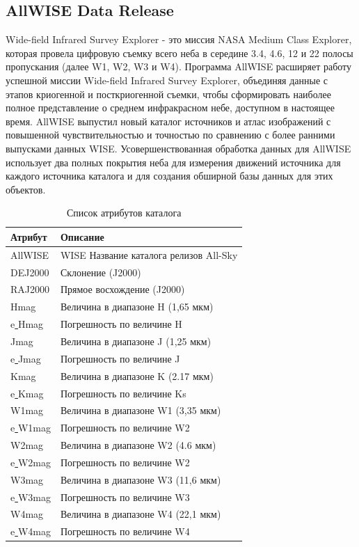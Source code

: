 \documentclass[12pt, a4paper]{article}
\begin{document}
	\subsection*{AllWISE Data Release}
	Wide-field Infrared Survey Explorer - это миссия NASA Medium Class Explorer, которая провела цифровую съемку всего неба в середине 3.4, 4.6, 12 и 22 полосы пропускания (далее W1, W2, W3 и W4). Программа AllWISE расширяет работу успешной миссии Wide-field Infrared Survey Explorer, объединяя данные с этапов криогенной и посткриогенной съемки, чтобы сформировать наиболее полное представление о среднем инфракрасном небе, доступном в настоящее время. AllWISE выпустил новый каталог источников и атлас изображений с повышенной чувствительностью и точностью по сравнению с более ранними выпусками данных WISE. Усовершенствованная обработка данных для AllWISE использует два полных покрытия неба для измерения движений источника для каждого источника каталога и для создания обширной базы данных для этих объектов.
	\newline
	\begin{table}[h]
	\centering
	\begin{tabular}{|l|l|}
	\hline
	Атрибут & Описание \\ \hline
	AllWISE & WISE Название каталога релизов All-Sky \\ \hline
	DEJ2000 & Склонение (J2000) \\ \hline
	RAJ2000 & Прямое восхождение (J2000) \\ \hline
	Hmag & Величина в диапазоне H (1,65 мкм) \\ \hline
	e\underline{ }Hmag & Погрешность по величине H \\ \hline
	Jmag & Величина в диапазоне J (1,25 мкм) \\ \hline
	e\underline{ }Jmag & Погрешность по величине J \\ \hline
	Kmag & Величина в диапазоне K (2.17 мкм) \\ \hline
	e\underline{ }Kmag & Погрешность по величине Ks \\ \hline
	W1mag & Величина в диапазоне W1 (3,35 мкм) \\ \hline
	e\underline{ }W1mag & Погрешность по величине W2 \\ \hline
	W2mag & Величина в диапазоне W2 (4.6 мкм) \\ \hline
	e\underline{ }W2mag & Погрешность по величине W2 \\ \hline
	W3mag & Величина в диапазоне W3 (11,6 мкм) \\ \hline
	e\underline{ }W3mag & Погрешность по величине W3 \\ \hline
	W4mag & Величина в диапазоне W4 (22,1 мкм) \\ \hline
	e\underline{ }W4mag & Погрешность по величине W4 \\ \hline	\end{tabular}
	\caption{Список атрибутов каталога}
	\end{table}
\end{document}
